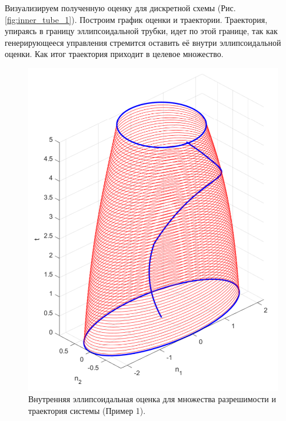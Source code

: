 Визуализируем полученную оценку для дискретной схемы (Рис. \eqref{fig:inner_tube_1}). 
Построим график оценки и траектории. Траектория, упираясь в границу эллипсоидальной трубки,
 идет по этой границе, так как генерирующееся управления стремится оставить её внутри
 эллипсоидальной оценки. Как итог траектория приходит в целевое множество.

\begin{figure}[ht]
	\centering
	\includegraphics[width = 0.6\linewidth]{"./resources/evolution_first_example_cropped.pdf"}
	\caption{Внутренняя эллипсоидальная оценка для множества разрешимости и траектория системы (Пример 1).}
    \label{fig:inner_tube_1}
\end{figure}

